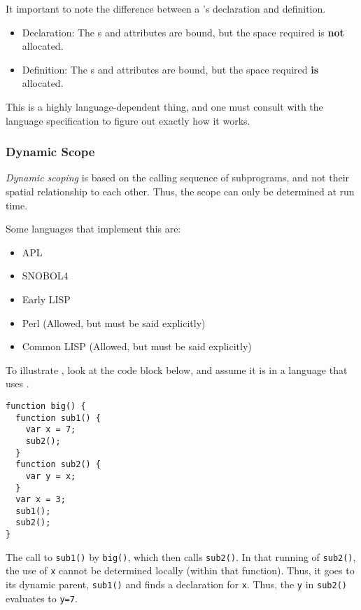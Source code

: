 It important to note the difference between a 's declaration and definition.
\begin{itemize}[noitemsep]
\item Declaration: The s and attributes are bound, but the  space required is \textbf{not} allocated.
\item Definition: The s and attributes are bound, but the  space required \textbf{is} allocated.
\end{itemize}

\begin{remark*}
  This is a highly language-dependent thing, and one must consult with the language specification to figure out exactly how it works.
\end{remark*}

\subsubsection{Dynamic Scope}\label{subsubsec:Dynamic_Scope}
\begin{definition}\label{def:Dynamic_Scoping}
  \emph{Dynamic scoping} is based on the calling sequence of subprograms, and not their spatial relationship to each other.
  Thus, the scope can only be determined at run time.

  Some languages that implement this are:
  \begin{itemize}[noitemsep]
  \item APL
  \item SNOBOL4
  \item Early LISP
  \item Perl (Allowed, but must be said explicitly)
  \item Common LISP (Allowed, but must be said explicitly)
  \end{itemize}
\end{definition}

To illustrate , look at the code block below, and assume it is in a language that uses .
\begin{verbatim}
function big() {
  function sub1() {
    var x = 7;
    sub2();
  }
  function sub2() {
    var y = x;
  }
  var x = 3;
  sub1();
  sub2();
}
\end{verbatim}

The call to \texttt{sub1()} by \texttt{big()}, which then calls \texttt{sub2()}.
In that running of \texttt{sub2()}, the use of \texttt{x} cannot be determined locally (within that function).
Thus, it goes to its dynamic parent, \texttt{sub1()} and finds a declaration for \texttt{x}.
Thus, the \texttt{y} in \texttt{sub2()} evaluates to \texttt{y=7}.


